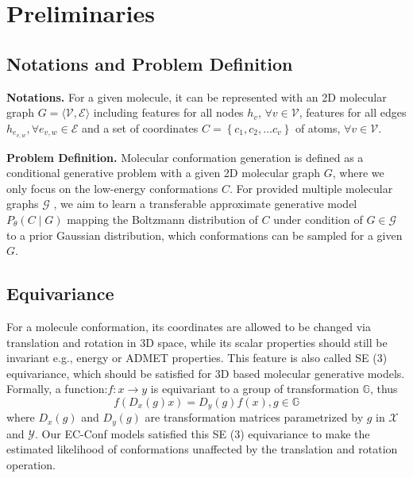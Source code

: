 \documentclass{article} %
\begin{document}
\section{Preliminaries}



\subsection{Notations and Problem Definition}

\textbf{Notations.} For a given molecule, it can be represented with an 2D molecular graph $G=\langle\mathcal{V}, \mathcal{E}\rangle$ including features for all nodes $h_v$, $\forall v \in \mathcal{V}$, features for all edges $h_{e_{v, w}}, \forall e_{v, w} \in \mathcal{E}$ and a set of coordinates $C=\left\{c_1, c_2, \ldots c_v\right\}$ of atoms, $\forall v \in \mathcal{V}$.



\textbf{Problem Definition.} Molecular conformation generation is defined as a conditional generative problem with a given 2D molecular graph $G$, where we only focus on the low-energy conformations $C$. For provided multiple molecular graphs $\mathcal{G}$ , we aim to learn a transferable approximate generative model $P_\theta(C \mid G)$ mapping the Boltzmann distribution of $C$ under condition of $G \in \mathcal{G}$ to a prior Gaussian distribution, which conformations can be sampled for a given $G$.


\subsection{Equivariance}
For a molecule conformation, its coordinates are allowed to be changed via translation and rotation in 3D space, while its scalar properties should still be invariant e.g., energy or ADMET properties. This feature is also called SE (3) equivariance, which should be satisfied for 3D based molecular generative models.  Formally, a function:$f: x \rightarrow y$ is equivariant to a group of transformation $\mathbb{G}$, thus
\begin{equation}
	f\left(D_x(g) x\right)=D_y(g) f(x), g \in \mathbb{G}
	\label{eq1}
\end{equation}
where $D_x(g)$ and $D_y(g)$ are transformation matrices parametrized by $g$ in $\mathcal{X}$ and $\mathcal{Y}$. Our EC-Conf models satisfied this SE (3) equivariance to make the estimated likelihood of conformations unaffected by the translation and rotation operation.
\end{document}
